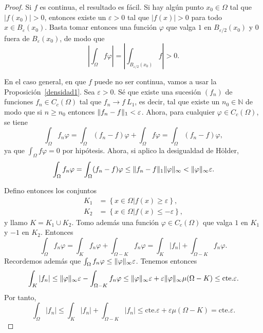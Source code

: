\documentclass[12pt,a4paper]{book}
\DeclarePairedDelimiter\norm{\lVert}{\rVert}
\theoremstyle{definition} \newtheorem{defn}[thm]{Definición}
\theoremstyle{definition} \newtheorem{ejemplo}[thm]{Ejemplo}
\theoremstyle{definition} \newtheorem{ejercicio}[thm]{Ejercicio}
\theoremstyle{remark} \newtheorem*{obs}{Observación}
\newcommand{\NN}{\mathbb{N}}
\newcommand{\cte}{\mathrm{cte.}}
\newcommand{\eps}{\varepsilon}
\begin{document}
\begin{proof}
  Si $f$ es continua, el resultado es fácil. Si hay algún punto $x_0 \in \Omega$ tal que $|f(x_0)| > 0$, entonces existe un $\varepsilon >0$ tal que $|f(x)|>0$ para todo $x\in B_{\varepsilon}(x_0)$. Basta tomar entonces una función $\varphi$ que valga $1$ en $B_{\varepsilon/2}(x_0)$ y $0$ fuera de $B_{\varepsilon}(x_0)$, de modo que 
  \begin{equation*}
    \left|\int_\Omega f \varphi\right| = \left|\int_{B_{\varepsilon/2}(x_0)}f\right| > 0.
  \end{equation*}

  En el caso general, en que $f$ puede no ser continua, vamos a usar la Proposición~\ref{densidad1}. Sea $\eps>0$. Sé que existe una sucesión $(f_n)$ de funciones $f_n \in C_c(\Omega)$ tal que $f_n \rightarrow f \ L_1$, es decir, tal que existe un $n_0 \in \NN$ de modo que si $n\geq n_0$ entonces $\norm{f_n-f}_1 < \eps$. Ahora, para cualquier $\varphi \in C_c(\Omega)$, se tiene
  \begin{equation*}
    \int_{\Omega} f_n \varphi = \int_{\Omega} (f_n-f) \varphi + \int_{\Omega} f \varphi = \int_{\Omega} (f_n-f) \varphi,
  \end{equation*}
  ya que $\int_{\Omega} f \varphi = 0$ por hipótesis. Ahora, si aplico la desigualdad de Hölder, 
  \begin{equation*}
    \int_{\Omega} f_n \varphi=\int_{\Omega} (f_n-f) \varphi \leq \norm{f_n-f}_1 \norm{\varphi}_{\infty} < \norm{\varphi}_{\infty} \eps.
  \end{equation*}

  Defino entonces los conjuntos
  \begin{align*}
    K_1 & = \left\{ x\in \Omega | f(x) \geq \eps \right\}, \\
    K_2 & = \left\{ x\in \Omega | f(x) \leq -\eps \right\},
  \end{align*}
  y llamo $K=K_1 \cup K_2$. Tomo además una función $\varphi \in C_c(\Omega)$ que valga $1$ en $K_1$ y $-1$ en $K_2$. Entonces
  \begin{equation*}
    \int_{\Omega} f_n \varphi = \int_K f_n \varphi + \int_{\Omega-K} f_n \varphi = \int_K |f_n| + \int_{\Omega-K} f_n \varphi.
  \end{equation*}
  Recordemos además que $\int_\Omega f_n \varphi \leq \norm{\varphi}_{\infty} \eps$. Tenemos entonces
  \begin{equation*}
    \int_K |f_n| \leq \norm{\varphi}_{\infty} \eps - \int_{\Omega-K}f_n\varphi\leq \norm{\varphi}_{\infty} \eps + \eps \norm{\varphi}_{\infty} \mu(\Omega-K) \leq \cte \eps.
  \end{equation*}
  Por tanto,
  \begin{equation*}
    \int_\Omega |f_n| \leq \int_K |f_n| + \int_{\Omega-K}|f_n| \leq \cte \eps + \eps \mu(\Omega-K) = \cte \eps.
  \end{equation*}


\end{proof}
\end{document}

